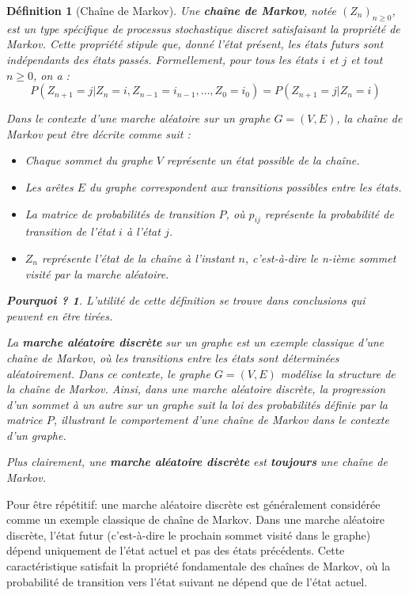 \documentclass{article}
\theoremstyle{pasdepoint}
\newtheorem{definition}{Définition}
\theoremstyle{break}
\theoremstyle{pasdepoint}
\newtheorem*{pourquoi}{Pourquoi ?}
\begin{document}
\begin{definition}[Chaîne de Markov]
    Une \textbf{chaîne de Markov}, notée $(Z_n)_{n \geq 0}$, est un type spécifique de processus stochastique discret satisfaisant la propriété de Markov. Cette propriété stipule que, donné l'état présent, les états futurs sont indépendants des états passés. Formellement, pour tous les états $i$ et $j$ et tout $n \geq 0$, on a :
    \[
    P(Z_{n+1} = j | Z_n = i, Z_{n-1} = i_{n-1}, \ldots, Z_0 = i_0) = P(Z_{n+1} = j | Z_n = i)
    \]

    Dans le contexte d'une marche aléatoire sur un graphe $G = (V, E)$, la chaîne de Markov peut être décrite comme suit :
    \begin{itemize}
        \item Chaque sommet du graphe $V$ représente un état possible de la chaîne.
        \item Les arêtes $E$ du graphe correspondent aux transitions possibles entre les états.
        \item La matrice de probabilités de transition $P$, où $p_{ij}$ représente la probabilité de transition de l'état $i$ à l'état $j$.
        \item $Z_n$ représente l'état de la chaîne à l'instant $n$, c'est-à-dire le n-ième sommet visité par la marche aléatoire.
    \end{itemize}
    \begin{pourquoi}
        L'utilité de cette définition se trouve dans conclusions qui peuvent en être tirées.

        La \textbf{marche aléatoire discrète} sur un graphe est un exemple classique d'une chaîne de Markov, où les transitions entre les états sont déterminées aléatoirement. Dans ce contexte, le graphe $G = (V, E)$ modélise la structure de la chaîne de Markov. Ainsi, dans une marche aléatoire discrète, la progression d'un sommet à un autre sur un graphe suit la loi des probabilités définie par la matrice $P$, illustrant le comportement d'une chaîne de Markov dans le contexte d'un graphe.

        Plus clairement, une \textbf{marche aléatoire discrète} est \textbf{toujours} une chaîne de Markov.
    \end{pourquoi}
\end{definition}

Pour être répétitif: une marche aléatoire discrète est généralement considérée comme un exemple classique de chaîne de Markov. Dans une marche aléatoire discrète, l'état futur (c'est-à-dire le prochain sommet visité dans le graphe) dépend uniquement de l'état actuel et pas des états précédents. Cette caractéristique satisfait la propriété fondamentale des chaînes de Markov, où la probabilité de transition vers l'état suivant ne dépend que de l'état actuel.
\end{document}
